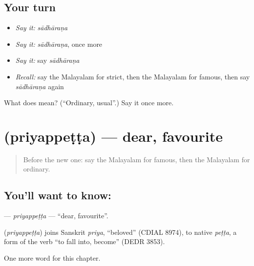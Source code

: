 \subsection*{Your turn}
\begin{itemize}
\raggedright
  \item \emph{Say it:} \emph{sādhāraṇa}
  \item \emph{Say it:} \emph{sādhāraṇa}, once more
  \item \emph{Say it:} say \emph{sādhāraṇa}
  \item \emph{Recall:} say the Malayalam for strict, then the Malayalam for famous, then say \emph{sādhāraṇa} again
\end{itemize}

\begin{tcolorbox}[breakable,colback=teal!4,colframe=teal!35!black,title={Before you move on}]
What does  mean? (\textquotedblleft{}Ordinary, usual\textquotedblright{}.) Say it once more.
\end{tcolorbox}
\section[\texorpdfstring{\ml{പ്രിയപ്പെട്ട} (priyappeṭṭa)}{പ്രിയപ്പെട്ട (priyappeṭṭa)}]{ (priyappeṭṭa) — dear, favourite}

\label{lesson:ML-C320-priyappetta}



\begin{quote}
Before the new one: say the Malayalam for famous, then the Malayalam for ordinary.
\end{quote}

\subsection*{You'll want to know: }
\textbf{} — \emph{priyappeṭṭa} — \textquotedblleft{}dear, favourite\textquotedblright{}.

\begin{cousinweb}
\textbf{} (\emph{priyappeṭṭa}) joins Sanskrit \emph{priya}, \textquotedblleft{}beloved\textquotedblright{} (CDIAL 8974), to native \emph{peṭṭa}, a form of the verb \textquotedblleft{}to fall into, become\textquotedblright{} (DEDR 3853).
\end{cousinweb}

\begin{grammarlens}[title={What you've built}]
One more word for this chapter.
\end{grammarlens}

